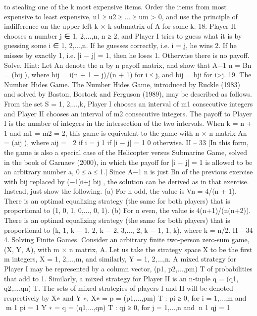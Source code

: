 to stealing one of the k most expensive items. Order the items from most expensive to
least expensive, u1 ≥ u2 ≥ ... ≥ um > 0, and use the principle of indifference on the upper
left k × k submatrix of A for some k.
18. Player II chooses a number j ∈ {1, 2,...,n}, n ≥ 2, and Player I tries to guess
what it is by guessing some i ∈ {1, 2,...,n}. If he guesses correctly, i.e. i = j, he wins 2.
If he misses by exactly 1, i.e. |i − j| = 1, then he loses 1. Otherwise there is no payoff.
Solve. Hint: Let An denote the n by n payoff matrix, and show that A−1 n = Bn = (bij ),
where bij = i(n + 1 − j)/(n + 1) for i ≤ j, and bij = bji for i>j.
19. The Number Hides Game. The Number Hides Game, introduced by Ruckle
(1983) and solved by Baston, Bostock and Ferguson (1989), may be described as follows.
From the set S = {1, 2,...,k}, Player I chooses an interval of m1 consecutive integers
and Player II chooses an interval of m2 consecutive integers. The payoff to Player I is
the number of integers in the intersection of the two intervals. When k = n + 1 and
m1 = m2 = 2, this game is equivalent to the game with n × n matrix An = (aij ), where
aij =
 2 if i = j
1 if |i − j| = 1
0 otherwise.
II – 33
[In this form, the game is also a special case of the Helicopter versus Submarine
Game, solved in the book of Garnaev (2000), in which the payoff for |i − j| = 1 is allowed
to be an arbitrary number a, 0 ≤ a ≤ 1.] Since A−1 n is just Bn of the previous exercise
with bij replaced by (−1)i+j bij , the solution can be derived as in that exercise. Instead,
just show the following.
(a) For n odd, the value is Vn = 4/(n + 1). There is an optimal equalizing strategy
(the same for both players) that is proportional to (1, 0, 1, 0,..., 0, 1).
(b) For n even, the value is 4(n+1)/(n(n+2)). There is an optimal equalizing strategy
(the same for both players) that is proportional to (k, 1, k − 1, 2, k − 2, 3,..., 2, k − 1, 1, k),
where k = n/2.
II – 34
4. Solving Finite Games.
Consider an arbitrary finite two-person zero-sum game, (X, Y, A), with m × n matrix,
A. Let us take the strategy space X to be the first m integers, X = {1, 2,...,m}, and
similarly, Y = {1, 2,...,n}. A mixed strategy for Player I may be represented by a column
vector, (p1, p2,...,pm)
T of probabilities that add to 1. Similarly, a mixed strategy for Player
II is an n-tuple q = (q1, q2,...,qn)
T. The sets of mixed strategies of players I and II will
be denoted respectively by X∗ and Y ∗,
X∗ = {p = (p1,...,pm)
T : pi ≥ 0, for i = 1,...,m and m
1 pi = 1}
Y ∗ = {q = (q1,...,qn)
T : qj ≥ 0, for j = 1,...,n and n
1 qj = 1}

